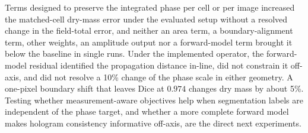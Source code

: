 \documentclass[11pt]{article}
\begin{document}
Terms designed to preserve the integrated phase per cell or per image increased
the matched-cell dry-mass error under the evaluated setup without a resolved
change in the field-total error, and neither an area term, a boundary-alignment
term, other weights, an amplitude output nor a forward-model term brought it
below the baseline in single runs. Under the implemented operator, the
forward-model residual identified the propagation distance in-line, did not
constrain it off-axis, and did not resolve a 10\% change of the phase scale in
either geometry. A one-pixel boundary shift that leaves Dice at $0.974$ changes
dry mass by about 5\%. Testing whether measurement-aware objectives help when
segmentation labels are independent of the phase target, and whether a more
complete forward model makes hologram consistency informative off-axis, are the
direct next experiments.


{\small

}
\end{document}
